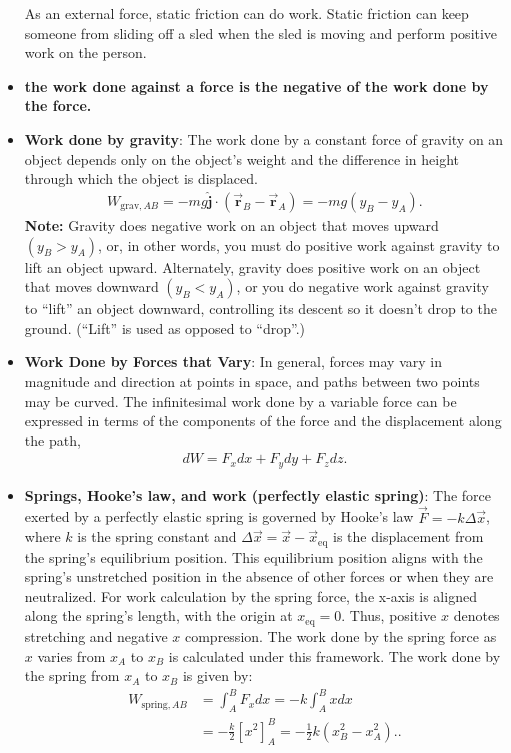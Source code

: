 \documentclass{report}
\begin{document}
\begin{itemize}
            \bigbreak \noindent 
            As an external force, static friction can do work. Static friction can keep someone from sliding off a sled when the sled is moving and perform positive work on the person. 
        \item \textbf{the work done against a force is the negative of the work done by the force.}
        \item \textbf{Work done by gravity}: The work done by a constant force of gravity on an object depends only on the object’s weight and the difference in height through which the object is displaced.
            \begin{align*}
                W_{\text{grav},AB} = -mg\hat{\mathbf{j}} \cdot (\vec{\mathbf{r}}_B - \vec{\mathbf{r}}_A) = -mg(y_B - y_A)
            .\end{align*}
            \textbf{Note:} Gravity does negative work on an object that moves upward $(y_B > y_A)$, or, in other words, you must do positive work against gravity to lift an object upward. Alternately, gravity does positive work on an object that moves downward $(y_B < y_A)$, or you do negative work against gravity to “lift” an object downward, controlling its descent so it doesn’t drop to the ground. (“Lift” is used as opposed to “drop”.)
        \item \textbf{Work Done by Forces that Vary}: In general, forces may vary in magnitude and direction at points in space, and paths between two points may be curved. The infinitesimal work done by a variable force can be expressed in terms of the components of the force and the displacement along the path,
            \begin{align*}
                dW = F_{x}dx + F_{y}dy + F_{z}dz
            .\end{align*}
        \item \textbf{Springs, Hooke's law, and work (perfectly elastic spring)}:
            The force exerted by a perfectly elastic spring is governed by Hooke's law $\vec{F} = -k\Delta\vec{x}$, where $k$ is the spring constant and $\Delta\vec{x} = \vec{x} - \vec{x}_{\text{eq}}$ is the displacement from the spring's equilibrium position. This equilibrium position aligns with the spring's unstretched position in the absence of other forces or when they are neutralized. For work calculation by the spring force, the x-axis is aligned along the spring's length, with the origin at $x_{\text{eq}} = 0$. Thus, positive $x$ denotes stretching and negative $x$ compression. The work done by the spring force as $x$ varies from $x_A$ to $x_B$ is calculated under this framework.
            \bigbreak \noindent 
            The work done by the spring from \( x_A \) to \( x_B \) is given by:
            \begin{align*}
                W_{\text{spring},AB} &= \int_{A}^{B} F_x dx = -k \int_{A}^{B} x dx  \\
                &= -\frac{k}{2} \left[ x^2 \right]_{A}^{B} = -\frac{1}{2}k(x_B^2 - x_A^2).
            .\end{align*}
            \bigbreak \noindent 
            

\end{itemize}
\end{document}
